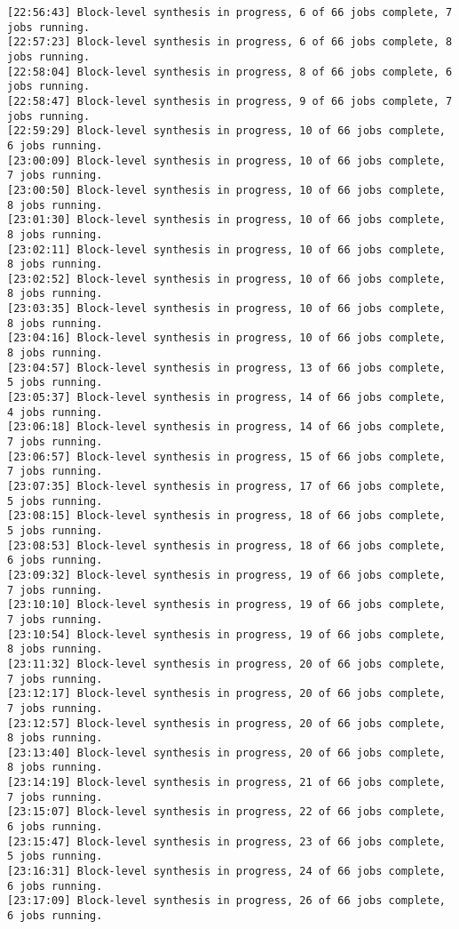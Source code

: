 \begin{lstlisting}[label=lst:code_2,caption=Содержимое файла  v++*.log]
[22:56:43] Block-level synthesis in progress, 6 of 66 jobs complete, 7 jobs running.
[22:57:23] Block-level synthesis in progress, 6 of 66 jobs complete, 8 jobs running.
[22:58:04] Block-level synthesis in progress, 8 of 66 jobs complete, 6 jobs running.
[22:58:47] Block-level synthesis in progress, 9 of 66 jobs complete, 7 jobs running.
[22:59:29] Block-level synthesis in progress, 10 of 66 jobs complete, 6 jobs running.
[23:00:09] Block-level synthesis in progress, 10 of 66 jobs complete, 7 jobs running.
[23:00:50] Block-level synthesis in progress, 10 of 66 jobs complete, 8 jobs running.
[23:01:30] Block-level synthesis in progress, 10 of 66 jobs complete, 8 jobs running.
[23:02:11] Block-level synthesis in progress, 10 of 66 jobs complete, 8 jobs running.
[23:02:52] Block-level synthesis in progress, 10 of 66 jobs complete, 8 jobs running.
[23:03:35] Block-level synthesis in progress, 10 of 66 jobs complete, 8 jobs running.
[23:04:16] Block-level synthesis in progress, 10 of 66 jobs complete, 8 jobs running.
[23:04:57] Block-level synthesis in progress, 13 of 66 jobs complete, 5 jobs running.
[23:05:37] Block-level synthesis in progress, 14 of 66 jobs complete, 4 jobs running.
[23:06:18] Block-level synthesis in progress, 14 of 66 jobs complete, 7 jobs running.
[23:06:57] Block-level synthesis in progress, 15 of 66 jobs complete, 7 jobs running.
[23:07:35] Block-level synthesis in progress, 17 of 66 jobs complete, 5 jobs running.
[23:08:15] Block-level synthesis in progress, 18 of 66 jobs complete, 5 jobs running.
[23:08:53] Block-level synthesis in progress, 18 of 66 jobs complete, 6 jobs running.
[23:09:32] Block-level synthesis in progress, 19 of 66 jobs complete, 7 jobs running.
[23:10:10] Block-level synthesis in progress, 19 of 66 jobs complete, 7 jobs running.
[23:10:54] Block-level synthesis in progress, 19 of 66 jobs complete, 8 jobs running.
[23:11:32] Block-level synthesis in progress, 20 of 66 jobs complete, 7 jobs running.
[23:12:17] Block-level synthesis in progress, 20 of 66 jobs complete, 7 jobs running.
[23:12:57] Block-level synthesis in progress, 20 of 66 jobs complete, 8 jobs running.
[23:13:40] Block-level synthesis in progress, 20 of 66 jobs complete, 8 jobs running.
[23:14:19] Block-level synthesis in progress, 21 of 66 jobs complete, 7 jobs running.
[23:15:07] Block-level synthesis in progress, 22 of 66 jobs complete, 6 jobs running.
[23:15:47] Block-level synthesis in progress, 23 of 66 jobs complete, 5 jobs running.
[23:16:31] Block-level synthesis in progress, 24 of 66 jobs complete, 6 jobs running.
[23:17:09] Block-level synthesis in progress, 26 of 66 jobs complete, 6 jobs running.

\end{lstlisting}
